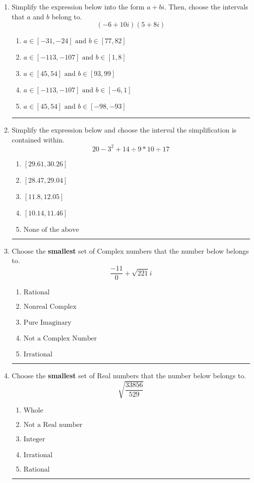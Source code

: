 \documentclass[14pt]{extbook}
\newcommand{\litem}[1]{\item#1\hspace*{-1cm}\rule{\textwidth}{0.4pt}}
\begin{document}
\begin{enumerate}
\litem{
Simplify the expression below into the form $a+bi$. Then, choose the intervals that $a$ and $b$ belong to.\[ (-6 + 10 i)(5 + 8 i) \]\begin{enumerate}[label=\Alph*.]
\item \( a \in [-31, -24] \text{ and } b \in [77, 82] \)
\item \( a \in [-113, -107] \text{ and } b \in [1, 8] \)
\item \( a \in [45, 54] \text{ and } b \in [93, 99] \)
\item \( a \in [-113, -107] \text{ and } b \in [-6, 1] \)
\item \( a \in [45, 54] \text{ and } b \in [-98, -93] \)

\end{enumerate} }
\litem{
Simplify the expression below and choose the interval the simplification is contained within.\[ 20 - 3^2 + 14 \div 9 * 10 \div 17 \]\begin{enumerate}[label=\Alph*.]
\item \( [29.61, 30.26] \)
\item \( [28.47, 29.04] \)
\item \( [11.8, 12.05] \)
\item \( [10.14, 11.46] \)
\item \( \text{None of the above} \)

\end{enumerate} }
\litem{
Choose the \textbf{smallest} set of Complex numbers that the number below belongs to.\[ \frac{-11}{0}+\sqrt{221} i \]\begin{enumerate}[label=\Alph*.]
\item \( \text{Rational} \)
\item \( \text{Nonreal Complex} \)
\item \( \text{Pure Imaginary} \)
\item \( \text{Not a Complex Number} \)
\item \( \text{Irrational} \)

\end{enumerate} }
\litem{
Choose the \textbf{smallest} set of Real numbers that the number below belongs to.\[ \sqrt{\frac{33856}{529}} \]\begin{enumerate}[label=\Alph*.]
\item \( \text{Whole} \)
\item \( \text{Not a Real number} \)
\item \( \text{Integer} \)
\item \( \text{Irrational} \)
\item \( \text{Rational} \)


\end{enumerate}}
\end{enumerate}
\end{document}
